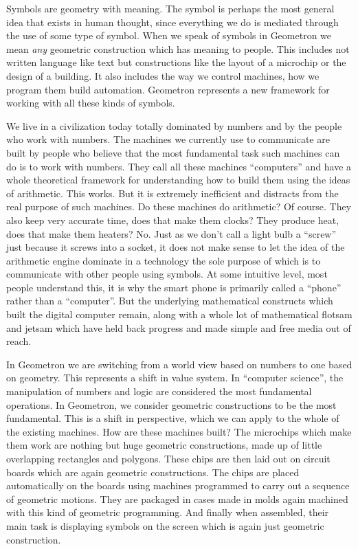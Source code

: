 
Symbols are geometry with meaning.  The symbol is perhaps the most general idea that exists in human thought, since everything we do is mediated through the use of some type of symbol.  When we speak of symbols in Geometron we mean \emph{any} geometric construction which has meaning to people.  This includes not written language like text but constructions like the layout of a microchip or the design of a building.  It also includes the way we control machines, how we program them build automation. Geometron represents a new framework for working with all these kinds of symbols.  

We live in a civilization today totally dominated by numbers and by the people who work with numbers.   The machines we currently use to communicate are built by people who believe that the most fundamental task such machines can do is to work with numbers.  They call all these machines ``computers'' and have a whole theoretical framework for understanding how to build them using the ideas of arithmetic.  This works. But it is extremely inefficient and distracts from the real purpose of such machines.   Do these machines do arithmetic? Of course.  They also keep very accurate time, does that make them clocks? They produce heat, does that make them heaters?  No.  Just as we don't call a light bulb a ``screw'' just because it screws into a socket, it does not make sense to let the idea of the arithmetic engine dominate in a technology the sole purpose of which is to communicate with other people using symbols.  At some intuitive level, most people understand this, it is why the smart phone is primarily called a ``phone'' rather than a ``computer''.  But the underlying mathematical constructs which built the digital computer remain, along with a whole lot of mathematical flotsam and jetsam which have held back progress and made simple and free media out of reach.
 
In Geometron we are switching from a world view based on numbers to one based on geometry.  This represents a shift in value system.  In ``computer science'', the manipulation of numbers and logic are considered the most fundamental operations.  In Geometron, we consider geometric constructions to be the most fundamental.  This is a shift in perspective, which we can apply to the whole of the existing machines.  How are these machines built? The microchips which make them work are nothing but huge geometric constructions, made up of little overlapping rectangles and polygons.  These chips are then laid out on circuit boards which are again geometric constructions.  The chips are placed automatically on the boards using machines programmed to carry out a sequence of geometric motions.   They are packaged in cases made in molds again machined with this kind of geometric programming. And finally when assembled, their main task is displaying symbols on the screen which is again just geometric construction.   

